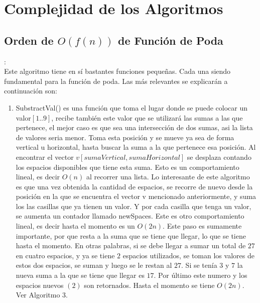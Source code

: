 \documentclass[conference]{IEEEtran}
\begin{document}
\section{Complejidad de los Algoritmos}

\subsection{Orden de $O(f(n))$ de Función de Poda}:\\
Este algoritmo tiene en s\'i bastantes funciones  pequeñas. Cada una siendo fundamental para la funci\'on de poda. Las m\'as relevantes se explicar\'an a continuaci\'on son:\\
\begin{enumerate}[I]
\item SubstractVal() es una funci\'on que toma el lugar donde se puede colocar un valor$[1..9]$, recibe tambi\'en este valor que se utilizar\'a las sumas a las que pertenece, el mejor caso es que sea una intersecci\'on de dos sumas, asi la lista de valores seria menor. Toma esta posici\'on y se mueve ya sea de forma vertical u horizontal, hasta buscar la suma a la que pertenece esa posici\'on. Al encontrar el vector $v[sumaVertical,sumaHorizontal]$ se desplaza contando los espacios disponibles que tiene esta suma.  Esto es un comportamiento lineal, es decir $O(n)$ al recorrer una lista. Lo interesante de este algoritmo es que una vez obtenida la cantidad de espacios, se recorre de nuevo desde la posici\'on en la que se encuentra el vector v mencionado anteriormente, y suma los las casillas que ya tienen  un valor. Y por cada casilla que tenga un valor, se aumenta un contador llamado newSpaces. Este es otro comportamiento lineal, es decir hasta el momento es un $O(2n)$. Este paso es sumamente importante, por que resta a la suma que se tiene que llegar, lo que se tiene hasta el momento. En otras palabras, si se debe llegar a sumar un total de $27$ en cuatro espacios, y ya se tiene $2$ espacios utilizados, se toman los valores de estos dos espacios, se suman y luego se le restan al $27$. Si se ten\'ia $3$ y $7$ la nueva suma a la que se tiene que llegar es $17$. Por \'ultimo este numero y los espacios nuevos  $(2)$ son retornados. Hasta el momento se tiene $O(2n)$. \\
Ver Algoritmo 3. 

\end{enumerate}
\end{document}
